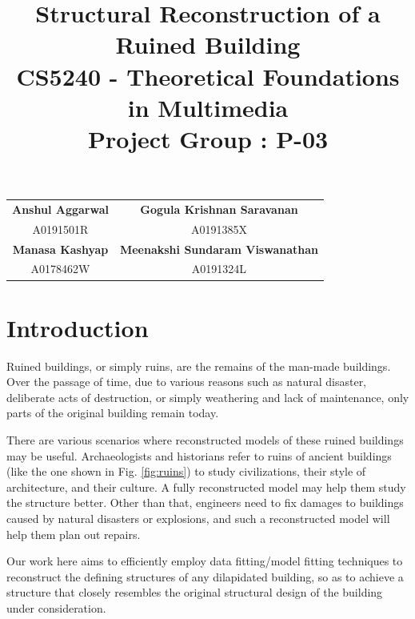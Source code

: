 \documentclass[12pt,a4paper]{article}
\title{\huge{Structural Reconstruction of a Ruined Building}\\ \vspace{1cm}\large{CS5240 - Theoretical Foundations in Multimedia}\\
        \large{Project Group : P-03}}
\date{}
\begin{document}
    
    \maketitle
    \vspace{-1.6cm}
    \begin{table}[h]
        \centering
        \begin{tabular}{cc}
            \textbf{\large{Anshul Aggarwal}} & \textbf{\large{Gogula Krishnan Saravanan}}      \vspace{0.2cm}\\
            A0191501R                & A0191385X                               \vspace{0.5cm}\\
            \textbf{\large{Manasa Kashyap}}  & \textbf{\large{Meenakshi Sundaram Viswanathan}} \vspace{0.2cm}\\
            A0178462W                & A0191324L                              
        \end{tabular}
    \end{table}
    
    
    
    \section{Introduction}
    
    Ruined buildings, or simply ruins, are the remains of the man-made buildings. Over the passage of time, due to various reasons such as natural disaster, deliberate acts of destruction, or simply weathering and lack of maintenance, only parts of the original building remain today.
    
    There are various scenarios where reconstructed models of these ruined buildings may be useful. Archaeologists and historians refer to ruins of ancient buildings (like the one shown in Fig. \ref{fig:ruins}) to study civilizations, their style of architecture, and their culture. A fully reconstructed model may help them study the structure better. Other than that, engineers need to fix damages to buildings caused by natural disasters or explosions, and such a reconstructed model will help them plan out repairs.
    
    Our work here aims to efficiently employ data fitting/model fitting techniques to reconstruct the defining structures of any dilapidated building, so as to achieve a structure that closely resembles the original structural design of the building under consideration.
    
\end{document}
